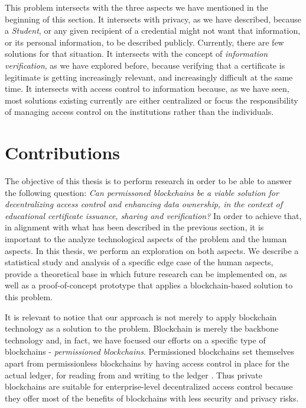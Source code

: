 This problem intersects with the three aspects we have mentioned in the beginning of this section. It intersects with privacy, as we have described, because a \textit{Student}, or any given recipient of a credential might not want that information, or its personal information, to be described publicly. Currently, there are few solutions for that situation. It intersects with the concept of \textit{information verification}, as we have explored before, because verifying that a certificate is legitimate is getting increasingly relevant, and increasingly difficult at the same time. It intersects with access control to information because, as we have seen, most solutions existing currently are either centralized or focus the responsibility of managing access control on the institutions rather than the individuals.

\section{Contributions}
\label{sec:contributions}

The objective of this thesis is to perform research in order to be able to answer the following question: \textit{Can permissoned blockchains be a viable solution for decentralizing access control and enhancing data ownership, in the context of educational certificate issuance, sharing and verification?} In order to achieve that, in alignment with what has been described in the previous section, it is important to the analyze technological aspects of the problem and the human aspects. In this thesis, we perform an exploration on both aspects. We describe a statistical study and analysis of a specific edge case of the human aspects, provide a theoretical base in which future research can be implemented on, as well as a proof-of-concept prototype that applies a blockchain-based solution to this problem.

It is relevant to notice that our approach is not merely to apply blockchain technology as a solution to the problem. Blockchain is merely the backbone technology and, in fact, we have focused our efforts on a specific type of blockchains - \textit{permissioned blockchains}. Permissioned blockchains set themselves apart from permissionless blockchains by having access control in place for the actual ledger, for reading from and writing to the ledger \cite{pilkington_blockchain_2016}. Thus private blockchains are suitable for enterprise-level decentralized access control because they offer most of the benefits of blockchains with less security and privacy risks.

